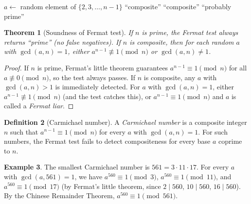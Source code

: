 \documentclass[twoside,12pt]{book}
\theoremstyle{plain}
\newtheorem{theorem}{Theorem}[chapter]
\theoremstyle{definition}
\newtheorem{definition}[theorem]{Definition}
\newtheorem{example}[theorem]{Example}
\theoremstyle{remark}
\begin{document}
\begin{algorithm}
\caption{Fermat Primality Test}
\label{alg:fermat}
\begin{algorithmic}[1]
 
        \State $a \gets$ random element of $\{2, 3, \ldots, n-1\}$
            \State \Return ``composite'' 
        \EndIf
            \State \Return ``composite''
        \EndIf
    \EndFor
    \State \Return ``probably prime''
\EndFunction
\end{algorithmic}
\end{algorithm}

\begin{theorem}[Soundness of Fermat test]
\label{thm:fermat-test}
If $n$ is prime, the Fermat test always returns ``prime'' (no false negatives). If $n$ is composite, then for each random $a$ with $\gcd(a, n) = 1$, either $a^{n-1} \not\equiv 1 \pmod{n}$ or $\gcd(a, n) \neq 1$.
\end{theorem}

\begin{proof}
If $n$ is prime, Fermat's little theorem guarantees $a^{n-1} \equiv 1 \pmod{n}$ for all $a \not\equiv 0 \pmod{n}$, so the test always passes. If $n$ is composite, any $a$ with $\gcd(a, n) > 1$ is immediately detected. For $a$ with $\gcd(a, n) = 1$, either $a^{n-1} \not\equiv 1 \pmod{n}$ (and the test catches this), or $a^{n-1} \equiv 1 \pmod{n}$ and $a$ is called a \emph{Fermat liar}.
\end{proof}

\begin{definition}[Carmichael number]
A \emph{Carmichael number} is a composite integer $n$ such that $a^{n-1} \equiv 1 \pmod{n}$ for every $a$ with $\gcd(a, n) = 1$. For such numbers, the Fermat test fails to detect compositeness for every base $a$ coprime to $n$.
\end{definition}

\begin{example}
The smallest Carmichael number is $561 = 3 \cdot 11 \cdot 17$. For every $a$ with $\gcd(a, 561) = 1$, we have $a^{560} \equiv 1 \pmod{3}$, $a^{560} \equiv 1 \pmod{11}$, and $a^{560} \equiv 1 \pmod{17}$ (by Fermat's little theorem, since $2 \mid 560$, $10 \mid 560$, $16 \mid 560$). By the Chinese Remainder Theorem, $a^{560} \equiv 1 \pmod{561}$.
\end{example}
\end{document}
